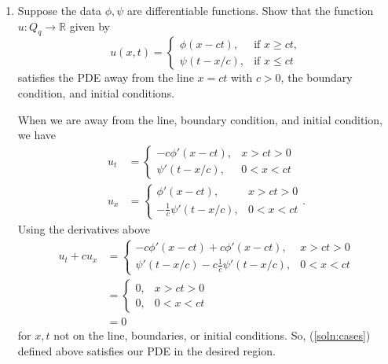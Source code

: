 \documentclass[a4paper,12pt]{article}
\newcommand{\reals}{\mathbb{R}}
\begin{document}
    \begin{enumerate}[label = \textbf{(\alph*)}]
        \item Suppose the data $ \phi, \psi $ are differentiable functions. Show that the function $ u : Q_{q} \to \reals $ given by 
        \begin{equation}
            u(x, t) = \begin{cases}
                \phi(x - ct), & \text{if } x \geq ct, \\
                \psi(t - x/c), & \text{if } x \leq ct
            \end{cases}
            \label{soln:cases}
        \end{equation}
        satisfies the PDE away from the line $ x = ct $ with $c > 0$, the boundary condition, and initial conditions. 
        
        When we are away from the line, boundary condition, and initial condition, we have
        \begin{align*}
            u_t &= \begin{cases}
                -c \phi'(x - ct), & x > ct > 0 \\
                \psi'(t - x/c), & 0 < x < ct
            \end{cases} \\
            u_x &= \begin{cases}
                \phi'(x - ct), & x > ct > 0 \\
                -\frac{1}{c} \psi'(t - x/c), & 0 < x < ct
            \end{cases}.
        \end{align*}
        Using the derivatives above
        \begin{align*}
            u_t + c u_x &= \begin{cases}
                -c \phi'(x - ct) + c \phi'(x - ct), & x > ct > 0 \\
                \psi'(t - x/c) - c \frac{1}{c} \psi'(t - x/c), & 0 < x < ct
            \end{cases} \\
            &= \begin{cases}
                0, & x > ct > 0 \\
                0, & 0 < x < ct
            \end{cases} \\
            &= 0
        \end{align*}
        for $ x,t $ not on the line, boundaries, or initial conditions. So, (\ref{soln:cases})  defined above satisfies our PDE in the desired region.
        

\end{enumerate}
\end{document}
